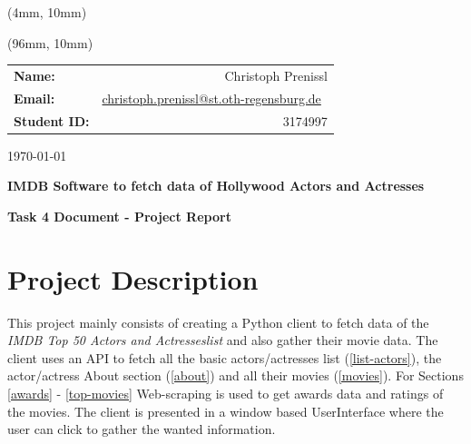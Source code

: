 \documentclass[12pt]{article}
\author{Christoph Prenissl}
\date{\today}
\begin{document}
\begin{titlepage}

      \begin{textblock*}{200mm}(4mm, 10mm)
            \begin{figure}
                  \def\svgscale{0.6}
                  
            \end{figure}
      \end{textblock*}

      \begin{textblock*}{200mm}(96mm, 10mm)
            \begin{tabular}[h]{lr}
                  \textbf{Name:}       & Christoph Prenissl                                                                              \\
                  \textbf{Email:}      & \href{mailto:christoph.prenissl@st.oth-regensburg.de}{christoph.prenissl@st.oth-regensburg.de}\ \\
                  \textbf{Student ID:} & 3174997                                                                                         \\
            \end{tabular}
      \end{textblock*}

      \begin{flushright}
            \today
      \end{flushright}

      \vspace{2cm}

      \begin{center}
            \textbf{\Large{IMDB Software to fetch data of Hollywood Actors and Actresses}}

            \vspace{6cm}

            \textbf{Task 4 Document - Project Report}

            \vspace{10cm}
      \end{center}
\end{titlepage}

\newpage

\tableofcontents

\newpage

\section{Project Description}
This project mainly consists of creating a Python client to fetch data of the 
\textit{IMDB Top 50 Actors and Actresseslist} and also gather their movie data. 
The client uses an API to fetch all the basic actors/actresses list (\ref{list-actors}),
the actor/actress About section (\ref{about}) and all their movies (\ref{movies}).
For Sections \ref{awards} - \ref{top-movies} Web-scraping is used to 
get awards data and ratings of the movies.
The client is presented in a window based UserInterface where the user 
can click to gather the wanted information.
\end{document}
